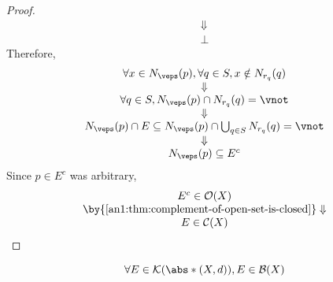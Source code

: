 \begin{proof}
\[\begin{array}{c}
      \Downarrow                                               \\
      \bot
    \end{array}
  \]
  Therefore,
  \[
    \begin{array}{c}
      \forall x \in N_{\veps}(p), \forall q \in S, x \notin N_{r_{q}}(q)                     \\
      \Downarrow                                                                             \\
      \forall q \in S, N_{\veps}(p) \cap N_{r_{q}}(q) = \vnot                                \\
      \Downarrow                                                                             \\
      N_{\veps}(p) \cap E \subseteq N_{\veps}(p) \cap \bigcup_{q \in S} N_{r_{q}}(q) = \vnot \\
      \Downarrow                                                                             \\
      N_{\veps}(p) \subseteq E^{c}
    \end{array}
  \]
  Since $p \in E^{c}$ was arbitrary,
  \[
    \begin{array}{c}
      E^{c} \in \mathcal{O}(X)                                        \\
      \by{\Cref{an1:thm:complement-of-open-set-is-closed}} \Downarrow \\
      E \in \mathcal{C}(X)
    \end{array}
  \]
\end{proof}

\begin{theorem} \label{an1:thm:compact-set-is-bounded}
  \[
    \forall E \in \mathcal{K}(\abs*{(X, d)}), E \in \mathcal{B}(X)
  \]
\end{theorem}

